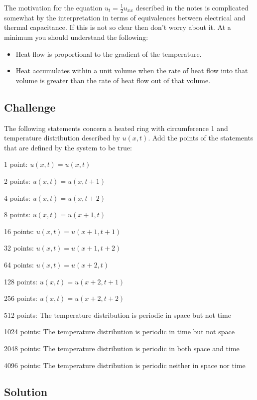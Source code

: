 The motivation for the equation $u_t = \frac{1}{2} u_{xx}$ described in the notes is complicated somewhat by the interpretation in terms of equivalences between electrical and thermal capacitance. If this is not so clear then don't worry about it. At a minimum you should understand the following:
\begin{itemize}
    \item Heat flow is proportional to the gradient of the temperature.
    \item Heat accumulates within a unit volume when the rate of heat flow into that volume is greater than the rate of heat flow out of that volume.
\end{itemize}

\subsection*{Challenge}
The following statements concern a heated ring with circumference 1 and temperature distribution described by $u(x,t)$. Add the points of the statements that are defined by the system to be true:

1 point: $\displaystyle u(x,t) = u(x,t)$

2 points: $\displaystyle u(x,t) = u(x,t+1)$

4 points: $\displaystyle u(x,t) = u(x,t+2)$

8 points: $\displaystyle u(x,t) = u(x+1,t)$

16 points: $\displaystyle u(x,t) = u(x+1,t+1)$

32 points: $\displaystyle u(x,t) = u(x+1,t+2)$

64 points: $\displaystyle u(x,t) = u(x+2,t)$

128 points: $\displaystyle u(x,t) = u(x+2,t+1)$

256 points: $\displaystyle u(x,t) = u(x+2,t+2)$

512 points: The temperature distribution is periodic in space but not time

1024 points: The temperature distribution is periodic in time but not space

2048 points: The temperature distribution is periodic in both space and time

4096 points: The temperature distribution is periodic neither in space nor time


\subsection*{Solution}




